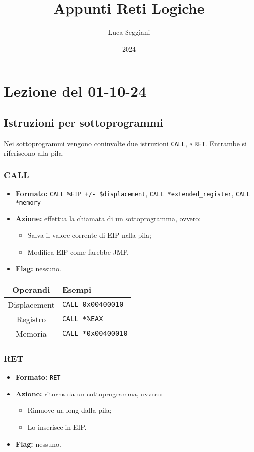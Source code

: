 \documentclass[a4paper,11pt]{article}
\title{Appunti Reti Logiche}
\author{Luca Seggiani}
\date{2024}
\begin{document}
\section{Lezione del 01-10-24}

\thispagestyle{empty}
\pagestyle{fancy}

\subsection{Istruzioni per sottoprogrammi}
Nei sottoprogrammi vengono coninvolte due istruzioni \lstinline|CALL|, e \lstinline|RET|.
Entrambe si riferiscono alla pila.


\subsubsection{CALL}
\begin{itemize}
	\item \textbf{Formato:} \lstinline|CALL %EIP +/- $displacement|, \lstinline|CALL *extended_register|, \lstinline|CALL *memory| 
	\item \textbf{Azione:} effettua la chiamata di un sottoprogramma, ovvero:
		\begin{itemize}
			\item Salva il valore corrente di EIP nella pila;
			\item Modifica EIP come farebbe JMP.
		\end{itemize}
	\item \textbf{Flag:} nessuno.
\end{itemize}

		\begin{table}[H]
		\center {}
			\begin{tabular} { c | p{5cm} }
				\bfseries Operandi & \bfseries Esempi \\
				\hline
				Displacement & \lstinline|CALL 0x00400010| \\ 
				Registro & \lstinline|CALL *%EAX| \\ 
				Memoria & \lstinline|CALL *0x00400010|
			\end{tabular}
		\end{table}

\subsubsection{RET}
\begin{itemize}
	\item \textbf{Formato:} \lstinline|RET|
	\item \textbf{Azione:} ritorna da un sottoprogramma, ovvero:
		\begin{itemize}
			\item Rimuove un long dalla pila;
			\item Lo inserisce in EIP.
		\end{itemize}
	\item \textbf{Flag:} nessuno.
\end{itemize}
\end{document}
